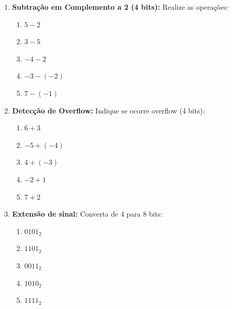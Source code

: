 \begin{enumerate}
          \begin{enumerate}
              \item $3 + 2$
              \item $5 + 3$
              \item $-3 + (-2)$
              \item $-4 + 3$
              \item $-6 + (-3)$
              \item $7 + 1$
          \end{enumerate}

    \item \textbf{Subtração em Complemento a 2 (4 bits):}
          Realize as operações:

          \begin{enumerate}
              \item $5 - 2$
              \item $3 - 5$
              \item $-4 - 2$
              \item $-3 - (-2)$
              \item $7 - (-1)$
          \end{enumerate}

    \item \textbf{Detecção de Overflow:}
          Indique se ocorre overflow (4 bits):

          \begin{enumerate}
              \item $6 + 3$
              \item $-5 + (-4)$
              \item $4 + (-3)$
              \item $-2 + 1$
              \item $7 + 2$
          \end{enumerate}

    \item \textbf{Extensão de sinal:}
          Converta de 4 para 8 bits:

          \begin{enumerate}
              \item $0101_2$
              \item $1101_2$
              \item $0011_2$
              \item $1010_2$
              \item $1111_2$
          \end{enumerate}


\end{enumerate}
